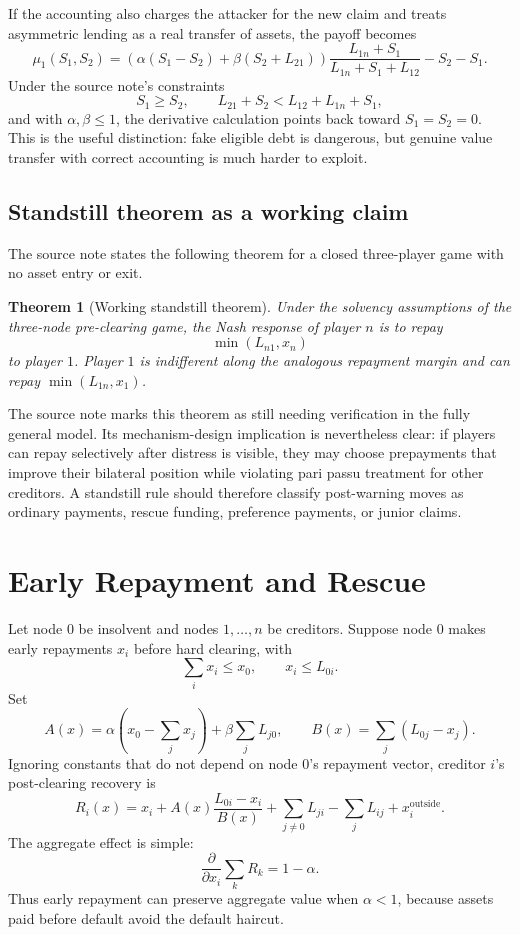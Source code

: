 \documentclass[11pt,oneside]{article}
\newtheorem{theorem}{Theorem}
\begin{document}
If the accounting also charges the attacker for the new claim and treats
asymmetric lending as a real transfer of assets, the payoff becomes
\[
  \mu_1(S_1,S_2)=
  \left(\alpha(S_1-S_2)+\beta(S_2+L_{21})\right)
  \frac{L_{1n}+S_1}{L_{1n}+S_1+L_{12}}
  -S_2-S_1.
\]
Under the source note's constraints
\[
  S_1\geq S_2,\qquad
  L_{21}+S_2<L_{12}+L_{1n}+S_1,
\]
and with $\alpha,\beta\leq1$, the derivative calculation points back toward
$S_1=S_2=0$. This is the useful distinction: fake eligible debt is dangerous,
but genuine value transfer with correct accounting is much harder to exploit.

\subsection{Standstill theorem as a working claim}

The source note states the following theorem for a closed three-player game
with no asset entry or exit.

\begin{theorem}[Working standstill theorem]
Under the solvency assumptions of the three-node pre-clearing game, the Nash
response of player $n$ is to repay
\[
  \min(L_{n1},x_n)
\]
to player $1$. Player $1$ is indifferent along the analogous repayment margin
and can repay $\min(L_{1n},x_1)$.
\end{theorem}

The source note marks this theorem as still needing verification in the fully
general model. Its mechanism-design implication is nevertheless clear: if
players can repay selectively after distress is visible, they may choose
prepayments that improve their bilateral position while violating pari passu
treatment for other creditors. A standstill rule should therefore classify
post-warning moves as ordinary payments, rescue funding, preference payments,
or junior claims.

\section{Early Repayment and Rescue}

Let node $0$ be insolvent and nodes $1,\ldots,n$ be creditors. Suppose node $0$
makes early repayments $x_i$ before hard clearing, with
\[
  \sum_i x_i\leq x_0,\qquad x_i\leq L_{0i}.
\]
Set
\[
  A(x)=\alpha\left(x_0-\sum_jx_j\right)+\beta\sum_jL_{j0},
  \qquad
  B(x)=\sum_j(L_{0j}-x_j).
\]
Ignoring constants that do not depend on node $0$'s repayment vector, creditor
$i$'s post-clearing recovery is
\[
  R_i(x)=
  x_i+
  A(x)\frac{L_{0i}-x_i}{B(x)}
  +\sum_{j\neq0}L_{ji}-\sum_jL_{ij}+x_i^{\mathrm{outside}}.
\]
The aggregate effect is simple:
\[
  \frac{\partial}{\partial x_i}\sum_kR_k=1-\alpha.
\]
Thus early repayment can preserve aggregate value when $\alpha<1$, because
assets paid before default avoid the default haircut.
\end{document}
